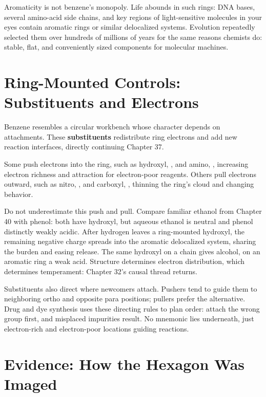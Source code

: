 Aromaticity is not benzene's monopoly. Life abounds in such rings: DNA bases, several amino-acid side chains, and key regions of light-sensitive molecules in your eyes contain aromatic rings or similar delocalized systems. Evolution repeatedly selected them over hundreds of millions of years for the same reasons chemists do: stable, flat, and conveniently sized components for molecular machines.

\section{Ring-Mounted Controls: Substituents and Electrons}

Benzene resembles a circular workbench whose character depends on attachments. These \textbf{substituents} redistribute ring electrons and add new reaction interfaces, directly continuing Chapter 37.

Some push electrons into the ring, such as hydroxyl, , and amino, , increasing electron richness and attraction for electron-poor reagents. Others pull electrons outward, such as nitro, , and carboxyl, , thinning the ring's cloud and changing behavior.

Do not underestimate this push and pull. Compare familiar ethanol from Chapter 40 with phenol: both have hydroxyl, but aqueous ethanol is neutral and phenol distinctly weakly acidic. After hydrogen leaves a ring-mounted hydroxyl, the remaining negative charge spreads into the aromatic delocalized system, sharing the burden and easing release. The same hydroxyl on a chain gives alcohol, on an aromatic ring a weak acid. Structure determines electron distribution, which determines temperament: Chapter 32's causal thread returns.

Substituents also direct where newcomers attach. Pushers tend to guide them to neighboring ortho and opposite para positions; pullers prefer the alternative. Drug and dye synthesis uses these directing rules to plan order: attach the wrong group first, and misplaced impurities result. No mnemonic lies underneath, just electron-rich and electron-poor locations guiding reactions.

\section{Evidence: How the Hexagon Was Imaged}

